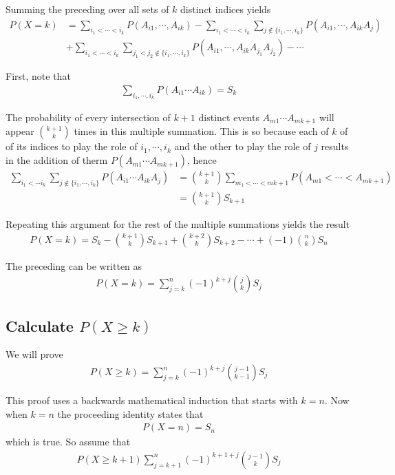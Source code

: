 \documentclass[10 pt,final]{article}
\newcommand{\impo}[1]{{\color{magenta} #1}}
\begin{document}
Summing the preceding over all sets of $k$ distinct indices yields
\begin{align*}
P(X=k) & = \sum_{i_1 < \cdots < i_k} P(A_{i1}, \cdots, A_{ik}) - \sum_{i_1 < \cdots < i_k} \sum_{j \not\in \{i_1, \cdots, i_k\}} P(A_{i1}, \cdots, A_{ik}A_j)\\
& +  \sum_{i_1 < \cdots < i_k} \sum_{j_1 < j_2 \not\in \{i_1, \cdots, i_k\}} P(A_{i1}, \cdots, A_{ik}A_{j_1}A_{j_2})  - \cdots
\end{align*}

First, note that 
\begin{align*}
\sum_{i_1, \cdots, i_k} P(A_{i1} \cdots A_{ik}) = S_k
\end{align*}

The probability of every intersection of $k+1$ distinct events $A_{m1} \cdots A_{m{k+1}}$ will appear $\binom{k+1}{k}$ times in this multiple summation. This is so because each of $k$ of of its indices to play the role of $i_1, \cdots, i_k$ and the other to play the role of $j$ results in the addition of therm $P(A_{m1} \cdots A_{mk+1})$, hence
\begin{align*}
\sum_{i_1 < \cdots i_k} \sum_{j \not\in \{i_1, \cdots, i_k\}} P(A_{i1} \cdots A_{ik} A_j) & = \binom{k+1}{k} \sum_{m_1 < \cdots < mk+1} P(A_{m1} < \cdots < A_{mk+1}) \\
& = \binom{k+1}{k} S_{k+1}
\end{align*}

Repeating this argument for the rest of the multiple summations yields the result
\begin{align*}
P(X=k) = S_k - \binom{k+1}{k} S_{k+1} + \binom{k+2}{k} S_{k+2} - \cdots + (-1)\binom{n}{k}S_n
\end{align*}

The preceding can be written as 
\begin{align*}
P(X=k) = \sum^n_{j=k} (-1)^{k+j} \binom{j}{k} S_j
\end{align*}


\subsection{Calculate $P(X \geq k)$} We will prove
\begin{align*}
P(X \geq k) = \sum^n_{j=k} (-1)^{k+j} \binom{j-1}{k-1} S_j
\end{align*}

This proof uses a \impo{backwards mathematical induction} that starts with $k=n$. Now when $k=n$ the proceeding identity states that 
\begin{align*}
P(X=n) = S_n
\end{align*}
which is true. So assume that 
\begin{align*}
P(X \geq k+1) \sum^n_{j=k+1} (-1)^{k+1+j} \binom{j-1}{k}S_j
\end{align*}
\end{document}
